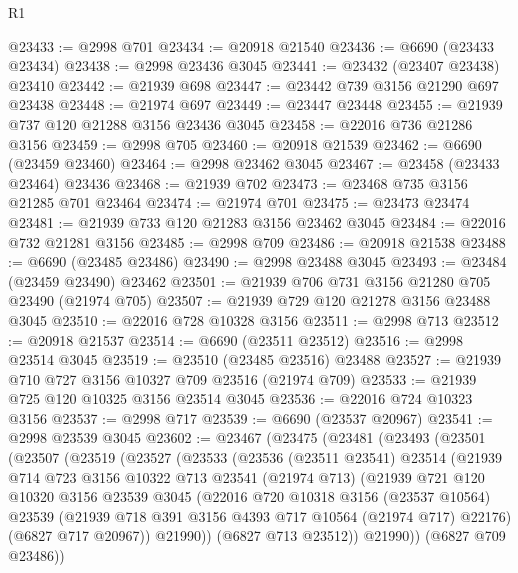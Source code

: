 \begin{lexlean}{R1}
\begin{coremodule}
@23433 := @2998 @701
@23434 := @20918 @21540
@23436 := @6690 (@23433 @23434)
@23438 := @2998 @23436 @3045
@23441 := @23432 (@23407 @23438) @23410
@23442 := @21939 @698
@23447 := @23442 @739 @3156 @21290 @697 @23438
@23448 := @21974 @697
@23449 := @23447 @23448
@23455 := @21939 @737 @120 @21288 @3156 @23436 @3045
@23458 := @22016 @736 @21286 @3156
@23459 := @2998 @705
@23460 := @20918 @21539
@23462 := @6690 (@23459 @23460)
@23464 := @2998 @23462 @3045
@23467 := @23458 (@23433 @23464) @23436
@23468 := @21939 @702
@23473 := @23468 @735 @3156 @21285 @701 @23464
@23474 := @21974 @701
@23475 := @23473 @23474
@23481 := @21939 @733 @120 @21283 @3156 @23462 @3045
@23484 := @22016 @732 @21281 @3156
@23485 := @2998 @709
@23486 := @20918 @21538
@23488 := @6690 (@23485 @23486)
@23490 := @2998 @23488 @3045
@23493 := @23484 (@23459 @23490) @23462
@23501 := @21939 @706 @731 @3156 @21280 @705 @23490 (@21974 @705)
@23507 := @21939 @729 @120 @21278 @3156 @23488 @3045
@23510 := @22016 @728 @10328 @3156
@23511 := @2998 @713
@23512 := @20918 @21537
@23514 := @6690 (@23511 @23512)
@23516 := @2998 @23514 @3045
@23519 := @23510 (@23485 @23516) @23488
@23527 := @21939 @710 @727 @3156 @10327 @709 @23516 (@21974 @709)
@23533 := @21939 @725 @120 @10325 @3156 @23514 @3045
@23536 := @22016 @724 @10323 @3156
@23537 := @2998 @717
@23539 := @6690 (@23537 @20967)
@23541 := @2998 @23539 @3045
@23602 := @23467
    (@23475
      (@23481
        (@23493
          (@23501
            (@23507
              (@23519
                (@23527
                  (@23533
                    (@23536
                      (@23511 @23541)
                      @23514
                      (@21939
                        @714
                        @723
                        @3156
                        @10322
                        @713
                        @23541
                        (@21974 @713)
                        (@21939
                          @721
                          @120
                          @10320
                          @3156
                          @23539
                          @3045
                          (@22016
                            @720
                            @10318
                            @3156
                            (@23537 @10564)
                            @23539
                            (@21939 @718 @391 @3156 @4393 @717 @10564 (@21974 @717) @22176)
                            (@6827 @717 @20967))
                          @21990))
                      (@6827 @713 @23512))
                    @21990))
                (@6827 @709 @23486))

\end{coremodule}
\end{lexlean}
